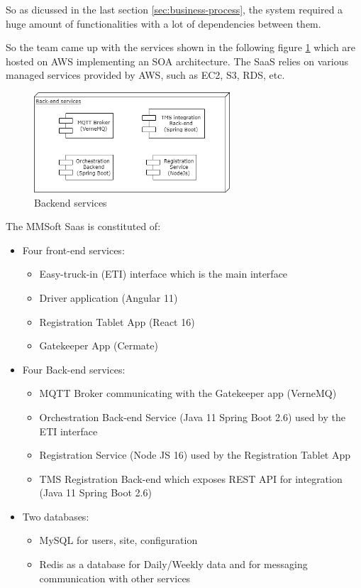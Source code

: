 So as dicussed in the last section \ref{sec:business-process}, the system required a huge
amount of functionalities with a lot of dependencies between them.

So the team came up with the services shown in the following figure
\ref{fig:backend_services} which are hosted  on AWS implementing an SOA architecture.
The SaaS relies on various managed services provided by AWS, such as EC2, S3, RDS, etc.

\begin{figure}[!htpb]
    \centering
    \includegraphics[width=0.65\textwidth]{images/Backend}
    \caption{\footnotesize{Backend services}}
    \label{fig:backend_services}
\end{figure}

The MMSoft Saas is constituted of:
\begin{itemize}
    \item Four front-end services:
    \begin{itemize}
        \item Easy-truck-in (ETI) interface which is the main interface
        \item Driver application (Angular 11)
        \item Registration Tablet App (React 16)
        \item Gatekeeper App (Cermate)
    \end{itemize}
    \item Four Back-end services:
    \begin{itemize}
        \item MQTT Broker communicating with the Gatekeeper app (VerneMQ)
        \item Orchestration Back-end Service (Java 11 Spring Boot 2.6) used by the ETI interface
        \item Registration Service (Node JS 16) used by the Registration Tablet App
        \item TMS Registration Back-end which exposes REST API for integration (Java 11 Spring Boot 2.6)
    \end{itemize}
    \item Two databases:
    \begin{itemize}
        \item MySQL for users, site, configuration
        \item Redis as a database for Daily/Weekly data and for messaging communication with other services
    \end{itemize}
\end{itemize}

